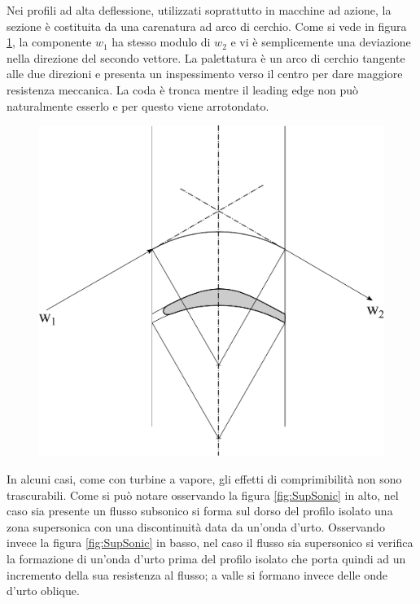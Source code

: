 Nei profili ad alta deflessione, utilizzati soprattutto in macchine ad azione, la sezione è costituita da una carenatura ad arco di cerchio. Come si vede in figura \ref{fig:palaBassaDef}, la componente $w_1$ ha stesso modulo di $w_2$ e vi è semplicemente una deviazione nella direzione del secondo vettore. La palettatura è un arco di cerchio tangente alle due direzioni e presenta un inspessimento verso il centro per dare maggiore resistenza meccanica. La coda è tronca mentre il leading edge non può naturalmente esserlo e per questo viene arrotondato. 
\begin{figure}
\centering
  \includegraphics[width=.6\textwidth]{fig/palaBassaDef.pdf}
\caption{}
\label{fig:palaBassaDef}
\end{figure}

In alcuni casi, come con turbine a vapore, gli effetti di comprimibilità non sono trascurabili.
Come si può notare osservando la figura \ref{fig:SupSonic} in alto, nel caso sia presente un flusso subsonico si forma sul dorso del profilo isolato una zona supersonica con una discontinuità data da un'onda d'urto. Osservando invece la figura \ref{fig:SupSonic} in basso, nel caso il flusso sia supersonico si verifica la formazione di un'onda d'urto prima del profilo isolato che porta quindi ad un incremento della sua resistenza al flusso; a valle si formano invece delle onde d'urto oblique.

